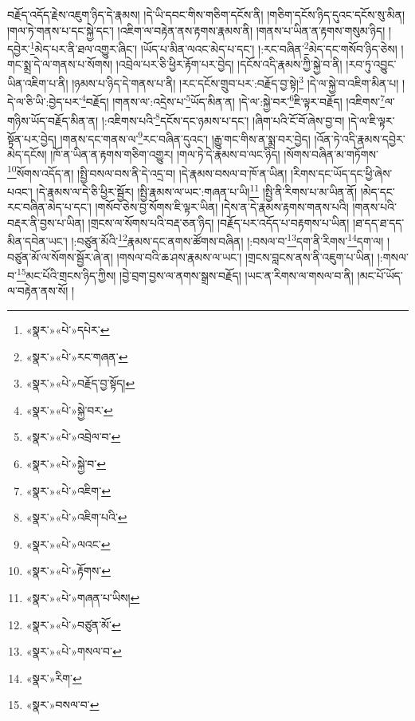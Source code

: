 བརྗོད་འདོད་རྗེས་འཇུག་ཉིད་དེ་རྣམས། །དེ་ཡི་དབང་གིས་གཅིག་དངོས་ནི། །གཅིག་དངོས་ཉིད་དུའང་དངོས་སུ་མིན། །གལ་ཏེ་གནས་པ་དང་སྐྱེ་དང་། །འཇིག་ལ་བརྟེན་ནས་རྟགས་རྣམས་ནི། །གནས་པ་ཡིན་ན་རྟགས་གསུམ་ཉིད། །དབྱེར་\footnote{«སྣར་»«པེ་»དཔེར་}མེད་པར་ནི་ཐལ་འགྱུར་ཞིང་། །ཡོད་པ་མིན་ལའང་མེད་པ་དང་། །:རང་བཞིན་\footnote{«སྣར་»«པེ་»རང་གཞན་}མེད་དང་གསོབ་ཉིད་ཅེས། །གང་སྨྲ་དེ་ལ་གནས་པ་སོགས། །འབྲེལ་པར་ཅི་ཕྱིར་རྟོག་པར་བྱེད། །དངོས་འདི་རྣམས་ཀྱི་སྐྱེ་བ་ནི། །རབ་ཏུ་འབྱུང་ཡིན་འཇིག་པ་ནི། །ཉམས་པ་ཉིད་དེ་གནས་པ་ནི། །རང་དངོས་གྲུབ་པར་:བརྗོད་བྱ་སྟེ།\footnote{«སྣར་»«པེ་»བརྗོད་བྱ་སྟོད།} །དེ་ལ་སྐྱེ་བ་འཇིག་མིན་པ། །དེ་ལ་ཅི་ཡི་:བྱེད་པར་\footnote{«སྣར་»«པེ་»སྐྱེ་བར་}བརྗོད། །གནས་ལ་:འདྲེས་པ་\footnote{«སྣར་»«པེ་»འབྲེལ་བ་}ཡོད་མིན་ན། །དེ་ལ་:སྐྱེ་བར་\footnote{«སྣར་»«པེ་»སྐྱེ་བ་}ཇི་ལྟར་བརྗོད། །འཇིགས་\footnote{«སྣར་»«པེ་»འཇིག་}ལ་གཉིས་ཡོད་བརྗོད་མིན་ན། །:འཇིགས་པའི་\footnote{«སྣར་»«པེ་»འཇིག་པའི་}དངོས་དང་ཉམས་པ་དང་། །ཞིག་པའི་ངོ་བོ་ཞེས་བྱ་བ། །དེ་ལ་ཇི་ལྟར་སྟོན་པར་བྱེད། །གནས་དང་གནས་ལ་\footnote{«སྣར་»«པེ་»ལའང་}རང་བཞིན་དུའང་། །རྒྱུ་གང་གིས་ན་སྨྲ་བར་བྱེད། །འོན་ཏེ་འདི་རྣམས་དབྱེར་མེད་དངོས། །ཁོ་ན་ཡིན་ན་རྟགས་གཅིག་འགྱུར། །གལ་ཏེ་དེ་རྣམས་བ་ལང་ཉིད། །སོགས་བཞིན་མ་གཏོགས་\footnote{«སྣར་»«པེ་»རྟོགས་}སོགས་འདོད་ན། །སྤྱི་བསལ་བས་ནི་དེ་འདྲ་བ། །དེ་རྣམས་བསལ་བ་ཁོ་ན་ཡིན། །རིགས་དང་ཡོད་དང་ཕྱི་ཞེས་པའང་། །དེ་རྣམས་ལ་དེ་ཅི་ཕྱིར་སྦྱོར། །སྤྱི་རྣམས་ལ་ཡང་:གཞན་པ་ཡི།\footnote{«སྣར་»«པེ་»གཞན་པ་ཡིས།} །སྤྱི་ནི་རིགས་པ་མ་ཡིན་ནོ། །མེད་དང་རང་བཞིན་མེད་པ་དང་། །གསོབ་ཅེས་བྱ་སོགས་ཇི་ལྟར་ཡིན། །དེས་ན་དེ་རྣམས་རྟགས་གནས་པའི། །གནས་པའི་བརྡར་ནི་བྱས་པ་ཡིན། །གྲངས་ལ་སོགས་པའི་བརྡ་ཅན་ཉིད། །བརྗོད་པར་འདོད་པ་བརྟགས་པ་ཡིན། །ཐ་དད་ཐ་དད་མིན་དབེན་ཡང་། །:བཙུན་མོའི་\footnote{«སྣར་»«པེ་»བཙུན་མོ་}རྣམས་དང་ནགས་ཚོགས་བཞིན། །:བསལ་བ་\footnote{«སྣར་»«པེ་»གསལ་བ་}དག་ནི་རིགས་\footnote{«སྣར་»རིག་}དག་ལ། །བཙུན་མོ་ལ་སོགས་སྦྱོར་ཞེ་ན། །གསལ་བའི་ཆ་ཤས་རྣམས་ལ་ཡང་། །གྲངས་བླངས་ནས་ནི་འཇུག་པ་ཡིན། །:གསལ་བ་\footnote{«སྣར་»བསལ་བ་}མང་པོའི་གྲངས་ཉིད་ཀྱིས། །བྱེ་བྲག་བྱས་ལ་ནགས་སྒྲས་བརྗོད། །ཡང་ན་རིགས་ལ་གསལ་བ་ནི། །མང་པོ་ཡོད་ལ་བརྟེན་ནས་སོ། །
